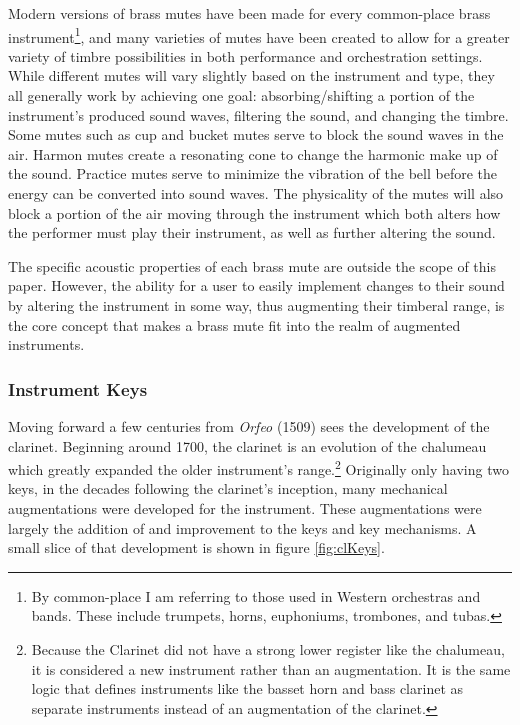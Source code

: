 Modern versions of brass mutes have been made for every common-place brass instrument\footnote{By common-place I am referring to those used in Western orchestras and bands. These include trumpets, horns, euphoniums, trombones, and tubas.}, and many varieties of mutes have been created to allow for a greater variety of timbre possibilities in both performance and orchestration settings. While different mutes will vary slightly based on the instrument and type, they all generally work by achieving one goal: absorbing/shifting a portion of the instrument's produced sound waves, filtering the sound, and changing the timbre. Some mutes such as cup and bucket mutes serve to block the sound waves in the air. Harmon mutes create a resonating cone to change the harmonic make up of the sound. Practice mutes serve to minimize the vibration of the bell before the energy can be converted into sound waves. The physicality of the mutes will also block a portion of the air moving through the instrument which both alters how the performer must play their instrument, as well as further altering the sound\cite{brassMutes1982}.

The specific acoustic properties of each brass mute are outside the scope of this paper. However, the ability for a user to easily implement changes to their sound by altering the instrument in some way, thus augmenting their timberal range, is the core concept that makes a brass mute fit into the realm of augmented instruments.

\subsubsection{Instrument Keys}

Moving forward a few centuries from \textit{Orfeo} (1509) sees the development of the clarinet. Beginning around 1700, the clarinet is an evolution of the chalumeau which greatly expanded the older instrument's range.\footnote{Because the Clarinet did not have a strong lower register like the chalumeau, it is considered a new instrument rather than an augmentation. It is the same logic that defines instruments like the basset horn and bass clarinet as separate instruments instead of an augmentation of the clarinet.} Originally only having two keys, in the decades following the clarinet's inception, many mechanical augmentations were developed for the instrument. These augmentations were largely the addition of and improvement to the keys and key mechanisms. A small slice of that development is shown in figure \ref{fig:clKeys}. 

